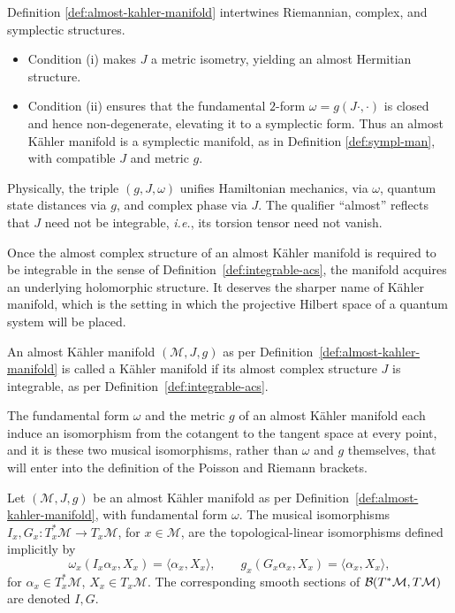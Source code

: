 \begin{remark}\label{rem:almost-kahler-meaning}
	Definition \ref{def:almost-kahler-manifold} intertwines Riemannian, complex, and symplectic structures. 
	\begin{itemize}
		\item Condition (i) makes $J$ a metric isometry, yielding an almost Hermitian structure. 
		\item Condition (ii) ensures that the fundamental $2$-form $\omega=g(J\cdot,\cdot)$ is closed and hence non-degenerate, elevating it to a symplectic form. Thus an almost Kähler manifold is a symplectic manifold, as in Definition \ref{def:sympl-man}, with compatible $J$ and metric $g$.
	\end{itemize} 
	Physically, the triple $(g,J,\omega)$ unifies Hamiltonian mechanics, via $\omega$, quantum state distances via $g$, and complex phase via $J$. The qualifier “almost” reflects that $J$ need not be integrable, \textit{i.e.}, its torsion tensor need not vanish.
\end{remark}

Once the almost complex structure of an almost Kähler manifold is required to be integrable in the sense of Definition~\ref{def:integrable-acs}, the manifold acquires an underlying holomorphic structure. It deserves the sharper name of Kähler manifold, which is the setting in which the projective Hilbert space of a quantum system will be placed.

\begin{definition}
	\label{def:kahler-manifold-hilbertian}
	An almost Kähler manifold $(\mathcal{M},J,g)$ as per
	Definition~\ref{def:almost-kahler-manifold} is called a Kähler
	manifold if its almost complex structure $J$ is integrable, as per
	Definition~\ref{def:integrable-acs}.
\end{definition}

\noindent The fundamental form $\omega$ and the metric $g$ of an almost Kähler manifold each induce an isomorphism from the cotangent to the tangent space at every point, and it is these two musical isomorphisms, rather than $\omega$ and $g$ themselves, that will enter into the definition of the Poisson and Riemann brackets.

\begin{definition}
	\label{def:musical-isomorphisms}
	Let $(\mathcal{M},J,g)$ be an almost Kähler manifold as per
	Definition~\ref{def:almost-kahler-manifold}, with fundamental form
	$\omega$. The musical isomorphisms $I_x,G_x:T_x^*\mathcal{M}\to T_x\mathcal{M}$, for
	$x\in\mathcal{M}$, are the topological-linear isomorphisms defined implicitly
	by
	\begin{equation}
		\omega_x(I_x\alpha_x,X_x)=\langle\alpha_x,X_x\rangle,\qquad g_x(G_x\alpha_x,X_x)=\langle\alpha_x,X_x\rangle,
	\end{equation}
	for $\alpha_x\in T_x^*\mathcal{M}$, $X_x\in T_x\mathcal{M}$. The corresponding smooth
	sections of $\B(T^*\mathcal{M},T\mathcal{M})$ are denoted $I,G$.
\end{definition}

